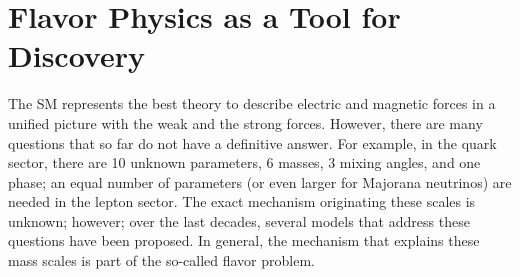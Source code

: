 \documentclass[a4paper,11pt]{article}
\begin{document}
\section{Flavor Physics as a Tool for Discovery}
The SM represents the best theory to describe electric and magnetic forces in a unified picture with the weak and the strong forces. However, there are many questions that so far do not have a definitive answer.  For example, in the quark sector, there are 10 unknown parameters, 6 masses, 3 mixing angles, and one phase; an equal number of parameters (or even larger for Majorana neutrinos) are needed in the lepton sector. The exact mechanism originating these scales is unknown; however; over the last decades, several models that address these questions have been proposed. In general, the mechanism that explains these mass scales is part of the so-called flavor problem.
%
\end{document}
